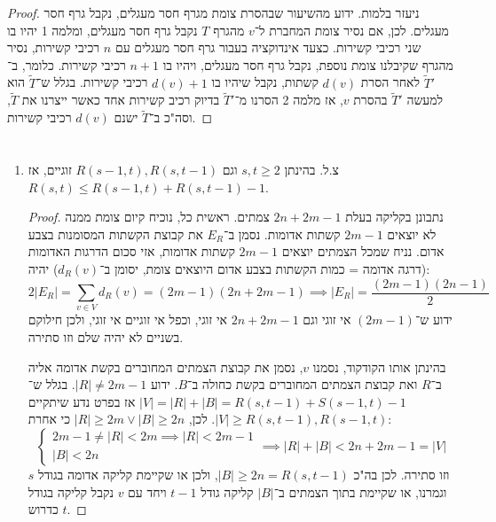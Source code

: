 \documentclass[]{article}
\newcommand\tl    {\tilde}
\begin{document}
\begin{proof}
		ניעזר בלמות. ידוע מהשיעור שבהסרת צומת מגרף חסר מעגלים, נקבל גרף חסר מעגלים. לכן, אם נסיר צומת המחברת ל־$v$ מהגרף $T$ נקבל גרף חסר מעגלים, ומלמה 1 יהיו בו שני רכיבי קשירות. כצעד אינדוקציה בעבור גרף חסר מעגלים עם $n$ רכיבי קשירות, נסיר מהגרף שקיבלנו צומת נוספת, נקבל גרף חסר מעגלים, ויהיו בו $n + 1$ רכיבי קשירות. כלומר, ב־$\tl T'$ לאחר הסרת $d(v)$ קשתות, נקבל שיהיו בו $d(v) + 1$ רכיבי קשירות. בגלל ש־$\tl T$ הוא למעשה $\tl T'$ בהסרת $v$, אז מלמה 2 הסרנו מ־$\tl T'$ בדיוק רכיב קשירות אחד כאשר ייצרנו את $\tl T$, וסה"כ ב־$\tl T$ ישנם $d(v)$ רכיבי קשירות. 
	\end{proof}
	\section{}
	\begin{enumerate}[A]
		\item צ.ל. בהינתן $s, t \ge 2$ וגם $R(s - 1, t), R(s, t - 1)$ זוגיים, אז $R(s, t) \le R(s - 1, t) + R(s, t - 1) - 1$. 
		
		\begin{proof}
			נתבונן בקליקה בעלת $2n + 2m - 1$ צמתים. ראשית כל, נוכיח קיום צומת ממנה לא יוצאים $2m - 1$ קשתות אדומות. נסמן ב־$E_R$ את קבוצת הקשתות המסומנות בצבע אדום. נניח שמכל הצמתים יוצאים $2m - 1$ קשתות אדומות, אזי סכום הדרגות האדומות (דרגה אדומה = כמות הקשתות בצבע אדום היוצאים צומת, יסומן ב־$d_R(v)$) יהיה: 
			\[ 2|E_R| = \sum_{v \in V} d_R(v) = (2m - 1)(2n + 2m - 1) \implies |E_R| = \frac{(2m - 1)(2n - 1)}{2} \]
			ידוע ש־$(2m - 1)$ אי זוגי וגם $2n + 2m - 1$ אי זוגי, וכפל אי זוגיים אי זוגי, ולכן חילוקם בשניים לא יהיה שלם וזו סתירה. 
			
			בהינתן אותו הקודקוד, נסמנו $v$, נסמן את קבוצת הצמתים המחוברים בקשת אדומה אליה ב־$R$ ואת קבוצת הצמתים המחוברים בקשת כחולה ב־$B$. ידוע $|R| \neq 2m - 1$. בגלל ש־$|V| = |R| + |B| = R(s, t - 1) + S(s - 1, t) - 1$ אז בפרט נדע שיתקיים $|V| \ge R(s, t - 1), R(s - 1, t)$. לכן, $|R| \ge 2m \lor |B| \ge 2n$ כי אחרת: 
			\[ \begin{cases}
				2m - 1 \neq |R| < 2m \implies |R| < 2m - 1 \\
				|B| < 2n
			\end{cases} \!\!\!\!\implies |R| + |B| < 2n + 2m -1 = |V|  \]
			וזו סתירה. לכן בה"כ $|B| \ge 2n = R(s, t - 1)$, ולכן או שקיימת קליקה אדומה בגודל $s$ וגמרנו, או שקיימת בתוך הצמתים ב־$|B|$ קליקה גודל $t - 1$ ויחד עם $v$ נקבל קליקה בגודל $t$ כדרוש. 
		\end{proof}
	\end{enumerate}
\end{document}
